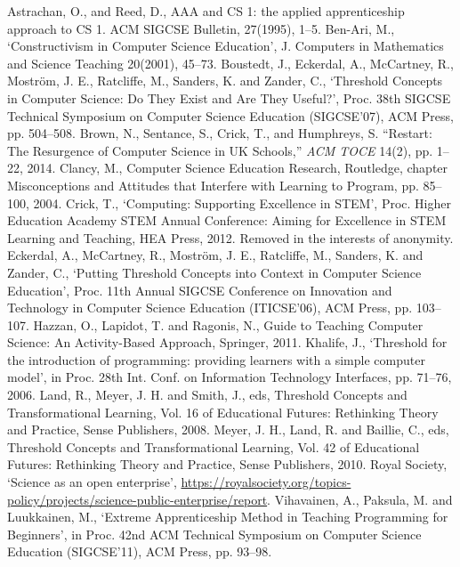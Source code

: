 \documentclass[conference,compsoc]{IEEEtran}
\begin{document}
\begin{thebibliography}{10}

Astrachan, O., and Reed, D., AAA and CS 1: the applied apprenticeship approach to CS 1. ACM SIGCSE Bulletin, 27(1995), 1--5.
Ben-Ari, M., `Constructivism in Computer Science Education', J. Computers in Mathematics and Science Teaching 20(2001), 45--73.
Boustedt, J., Eckerdal, A., McCartney, R.,
  Mostr\"om, J. E., Ratcliffe, M., Sanders, K. and Zander, C.,
  `Threshold Concepts in Computer Science: Do They Exist and Are They
  Useful?', Proc. 38th SIGCSE Technical Symposium on Computer Science
  Education (SIGCSE'07), ACM Press, pp. 504--508.
Brown, N., Sentance, S., Crick, T., and Humphreys, S. ``{Restart: The Resurgence
  of Computer Science in UK Schools},'' \emph{{ACM TOCE}} 14(2), pp.
  1--22, 2014.
Clancy, M., Computer Science Education Research,
  Routledge, chapter Misconceptions and Attitudes that Interfere with
  Learning to Program, pp. 85--100, 2004.
Crick, T., `Computing: Supporting Excellence in STEM', 
Proc. Higher Education Academy STEM Annual Conference: Aiming for
Excellence in STEM Learning and Teaching, HEA Press, 2012.
Removed in the interests of anonymity.
Eckerdal, A., McCartney, R., Mostr\"om, J. E., Ratcliffe, M., Sanders, K. and Zander, C., `Putting Threshold Concepts into Context in Computer Science Education', Proc. 11th Annual SIGCSE Conference on Innovation and Technology in Computer Science Education (ITICSE'06), ACM Press, pp. 103--107.
Hazzan, O., Lapidot, T. and Ragonis, N., Guide to Teaching Computer Science: An Activity-Based Approach, Springer, 2011.
Khalife, J., `Threshold for the introduction of
  programming: providing learners with a simple computer model', in
  Proc. 28th Int. Conf. on Information Technology Interfaces,
  pp. 71--76, 2006.
Land, R., Meyer, J. H. and Smith, J., eds, Threshold Concepts and Transformational Learning, Vol. 16 of Educational Futures: Rethinking Theory and Practice, Sense Publishers, 2008.
Meyer, J. H., Land, R. and Baillie, C., eds, Threshold Concepts and Transformational Learning, Vol. 42 of Educational Futures: Rethinking Theory and Practice, Sense Publishers, 2010.
Royal Society, `Science as an open enterprise', \url{https://royalsociety.org/topics-policy/projects/science-public-enterprise/report}.
Vihavainen, A., Paksula, M. and Luukkainen, M., `Extreme Apprenticeship Method in Teaching Programming for Beginners', in Proc. 42nd ACM Technical Symposium on Computer Science Education (SIGCSE'11), ACM Press, pp. 93--98.


\end{thebibliography}
\end{document}

